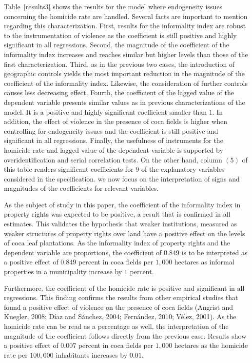 \documentclass[12pt,a4paper,english]{article}%
\begin{document}
Table~\ref{results3} shows the results for the model where endogeneity issues concerning the homicide rate are handled. Several facts are important to mention regarding this characterization. First, results for the informality index are robust to the instrumentation of violence as the coefficient is still positive and highly significant in all regressions. Second, the magnitude of the coefficient of the informality index increases and reaches similar but higher levels than those of the first characterization. Third, as in the previous two cases, the introduction of geographic controls yields the most important reduction in the magnitude of the coefficient of the informality index. Likewise, the consideration of further controls causes less decreasing effect. Fourth, the coefficient of the lagged value of the dependent variable presents similar values as in previous characterizations of the model. It is a positive and highly significant coefficient smaller than $1$. In addition, the effect of violence in the presence of coca fields is higher when controlling for endogeneity issues and the coefficient is still positive and significant in all regressions. Finally, the usefulness of instruments for the homicide rate and lagged value of the dependent variable is supported by overidentification and serial correlation tests. On the other hand, column $(5)$ of this table renders significant coefficients for 9 of the explanatory variables considered in the specification. we now focus on the interpretation of signs and magnitudes of the coefficients for relevant variables.

As the subject of study in this paper, the coefficient of the informality index in property rights was expected to be positive, a result that is confirmed in all estimates. This validates the hypothesis that weaker institutions, measured as weaker structures of property rights over land have a positive effect on the levels of coca leaf plantations. As the informality index of property rights and the dependent variable are proportions, the coefficient of $0.849$ is to be interpreted as a positive effect of $0.849$ percent in coca fields per $1,000$ hectares as informal properties in a municipality increase by $1$ percent. 

Furthermore, the coefficient of the homicide rate is positive and significant in all regressions. This finding confirms the results from other empirical studies that found a positive effect of violence on the presence of coca fields (Angrist and Kuegler, 2008; D\'{i}az and S\'{a}nchez, 2004; Fern\'{a}ndez, 2010; V\'{e}lez, 2001). As the homicide rate can be read as a percentage as well, the interpretation of the magnitude of the coefficient follows directly from the previous case. Results show a positive effect of $0.007$ percent in coca fields per $1,000$ hectares as the homicide rate per $100,000$ inhabitants increases by $0.01$. 
\end{document}
